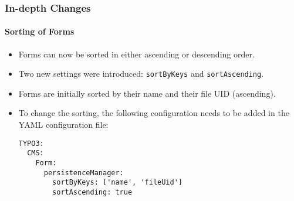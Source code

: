 \begin{frame}[fragile]
	\frametitle{In-depth Changes}
	\framesubtitle{Sorting of Forms}

	\lstset{basicstyle=\tiny\ttfamily}

	\begin{itemize}
		\item Forms can now be sorted in either ascending or descending order.
		\item Two new settings were introduced: \texttt{sortByKeys} and \texttt{sortAscending}.
		\item Forms are initially sorted by their name and their file UID (ascending).
		\item To change the sorting, the following configuration needs to be added in the YAML configuration file:
\begin{lstlisting}
TYPO3:
  CMS:
    Form:
      persistenceManager:
        sortByKeys: ['name', 'fileUid']
        sortAscending: true
\end{lstlisting}

	\end{itemize}

\end{frame}

